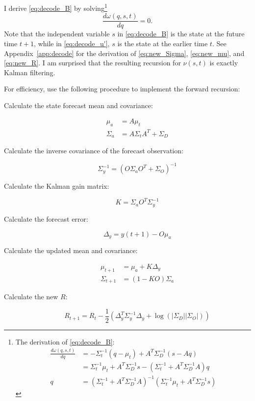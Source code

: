 \documentclass[11pt]{article}
\newcommand{\ti}[2]{{#1}{(#2)}}                         %
\newcommand{\logdet}{\log\left(\left|\Sigma_D\right| \left| \Sigma_O
    \right| \right)}
\begin{document}
I derive \eqref{eq:decode_B} by
solving\footnote{The derivation of \eqref{eq:decode_B}:
  \begin{align*}
    \frac{d \omega(q,s,t)}{d q} &= -\Sigma_t^{-1}(q-\mu_t) + A^T \Sigma_D^{-1}
    (s - Aq) \\
    &= \Sigma_t^{-1}\mu_t + A^T \Sigma_D^{-1} s -(\Sigma_t^{-1} +
    A^T\Sigma_D^{-1}A)q \\
    q &= \left( \Sigma_t^{-1} + A^T\Sigma_D^{-1}A\right)^{-1} \left(
      \Sigma_t^{-1}\mu_t + A^T \Sigma_D^{-1} s \right)
  \end{align*}
}
\begin{equation*}
  \frac{d \omega(q,s,t)}{d q} = 0.
\end{equation*}
Note that the independent variable $s$ in \eqref{eq:decode_B} is the
state at the future time $t+1$, while in \eqref{eq:decode_u'}, $s$ is
the state at the earlier time $t$.  See Appendix~\ref{app:decode} for
the derivation of \eqref{eq:new_Sigma}, \eqref{eq:new_mu}, and
\eqref{eq:new_R}.  I am surprised that the resulting recursion for
$\nu(s,t)$ is exactly Kalman filtering.

For efficiency, use the following procedure to implement the forward
recursion:
\begin{description}
\item[Calculate the state forecast mean and covariance:]
  \begin{align*}
    \mu_a &= A\mu_t \\
    \Sigma_a &= A \Sigma_t A^T + \Sigma_D
  \end{align*}
\item[Calculate the inverse covariance of the forecast observation:]
  \begin{equation*}
   \Sigma_y^{-1} = \left( O\Sigma_a O^T + \Sigma_O \right)^{-1}
  \end{equation*}
\item[Calculate the Kalman gain matrix:]
  \begin{equation*}
    K = \Sigma_a O^T \Sigma_y^{-1}
  \end{equation*}
\item[Calculate the forecast error:]
  \begin{equation*}
    \Delta_y = \ti{y}{t+1} - O\mu_a
  \end{equation*}
\item[Calculate the updated mean and covariance:]
  \begin{align}
    \label{eq:Sigma_alg}
    \mu_{t+1} &= \mu_a +  K\Delta_y \\
    \label{eq:mu_alg}
    \Sigma_{t+1} &= (1-KO)\Sigma_a
  \end{align}
\item[Calculate the new $R$:]
  \begin{equation}
    \label{eq:R_alg}
    R_{t+1} = R_t - \frac{1}{2} \left(\Delta_y^T \Sigma_y^{-1}
      \Delta_y + \logdet \right)
  \end{equation}
\end{description}
\end{document}
